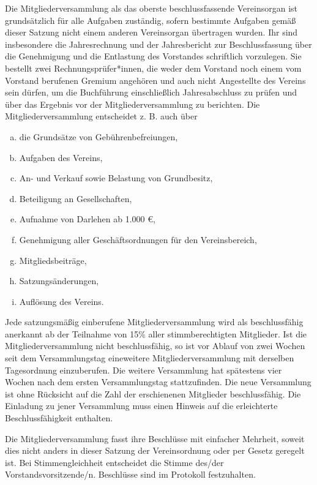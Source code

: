 \begin{contract}
    Die Mitgliederversammlung als das oberste beschlussfassende Vereinsorgan ist grundsätzlich für alle Aufgaben zuständig, sofern bestimmte Aufgaben gemäß dieser Satzung nicht einem anderen Vereinsorgan übertragen wurden. Ihr sind insbesondere die Jahresrechnung und der Jahresbericht zur Beschlussfassung über die Genehmigung und die Entlastung des Vorstandes schriftlich vorzulegen. Sie bestellt zwei Rechnungsprüfer*innen, die weder dem Vorstand noch einem vom Vorstand berufenen Gremium angehören und auch nicht Angestellte des Vereins sein dürfen, um die Buchführung einschließlich Jahresabschluss zu prüfen und über das Ergebnis vor der Mitgliederversammlung zu berichten. Die Mitgliederversammlung entscheidet z. B. auch über
    \begin{enumerate}[(a)]
        \item die Grundsätze von Gebührenbefreiungen,
        \item Aufgaben des Vereins,
        \item An- und Verkauf sowie Belastung von Grundbesitz,
        \item Beteiligung an Gesellschaften,
        \item Aufnahme von Darlehen ab 1.000 €,
        \item Genehmigung aller Geschäftsordnungen für den Vereinsbereich,
        \item Mitgliedsbeiträge,
        \item Satzungsänderungen,
        \item Auflösung des Vereins.
    \end{enumerate}

    Jede satzungsmäßig einberufene Mitgliederversammlung wird als beschlussfähig anerkannt ab der Teilnahme von 15\% aller stimmberechtigten Mitglieder. Ist die Mitgliederversammlung nicht beschlussfähig, so ist vor Ablauf von zwei Wochen seit dem Versammlungstag eineweitere Mitgliederversammlung mit derselben Tagesordnung einzuberufen. Die weitere Versammlung hat spätestens vier Wochen nach dem ersten Versammlungstag stattzufinden. Die neue Versammlung ist ohne Rücksicht auf die Zahl der erschienenen Mitglieder beschlussfähig. Die Einladung zu jener Versammlung muss einen Hinweis auf die erleichterte Beschlussfähigkeit enthalten.

    Die Mitgliederversammlung fasst ihre Beschlüsse mit einfacher Mehrheit, soweit dies nicht anders in dieser Satzung der Vereinsordnung oder per Gesetz geregelt ist. Bei Stimmengleichheit entscheidet die Stimme des/der Vorstandsvorsitzende/n. Beschlüsse sind im Protokoll festzuhalten.
    \label{abstimmungsart}


\end{contract}
